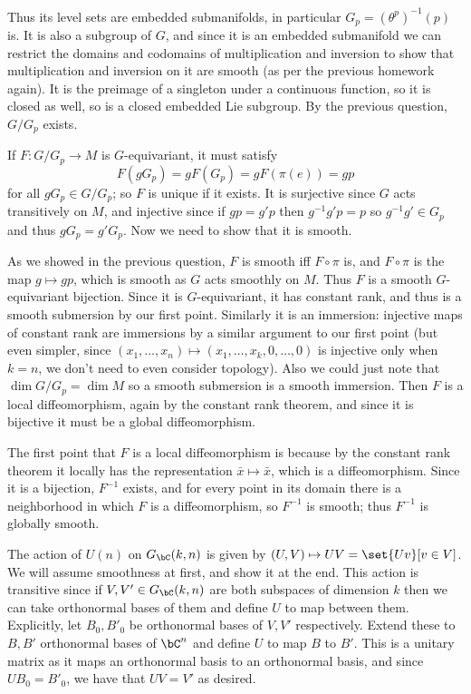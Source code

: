     Thus its level sets are embedded submanifolds, in particular $G_p=(\theta^p)^{-1}(p)$ is.
    It is also a subgroup of $G$, and since it is an embedded submanifold we can restrict the domains and codomains of multiplication and inversion to show that multiplication
    and inversion on it are smooth (as per the previous homework again).
    It is the preimage of a singleton under a continuous function, so it is closed as well, so is a closed embedded Lie subgroup.
    By the previous question, $G/G_p$ exists.

    \item If $F\colon G/G_p\to M$ is $G$-equivariant, it must satisfy
    $$ F(gG_p) = gF(G_p) = gF(\pi(e)) = gp $$
    for all $gG_p\in G/G_p$; so $F$ is unique if it exists.
    It is surjective since $G$ acts transitively on $M$, and injective since if $gp=g'p$ then $g^{-1}g'p=p$ so $g^{-1}g'\in G_p$ and thus $gG_p=g'G_p$.
    Now we need to show that it is smooth.

    As we showed in the previous question, $F$ is smooth iff $F\circ\pi$ is, and $F\circ\pi$ is the map $g\mapsto gp$, which is smooth as $G$ acts smoothly on $M$.
    Thus $F$ is a smooth $G$-equivariant bijection.
    Since it is $G$-equivariant, it has constant rank, and thus is a smooth submersion by our first point.
    Similarly it is an immersion: injective maps of constant rank are immersions by a similar argument to our first point (but even simpler, since $(x_1,\dots,x_n)\mapsto(x_1,\dots,x_k,0,\dots,0)$
    is injective only when $k=n$, we don't need to even consider topology).
    Also we could just note that $\dim G/G_p=\dim M$ so a smooth submersion is a smooth immersion.
    Then $F$ is a local diffeomorphism, again by the constant rank theorem, and since it is bijective it must be a global diffeomorphism.

    The first point that $F$ is a local diffeomorphism is because by the constant rank theorem it locally has the representation $\bar x\mapsto\bar x$, which is a diffeomorphism.
    Since it is a bijection, $F^{-1}$ exists, and for every point in its domain there is a neighborhood in which $F$ is a diffeomorphism, so $F^{-1}$ is smooth; thus $F^{-1}$
    is globally smooth.

    \item The action of $U(n)$ on $G_\bC(k,n)$ is given by $(U,V)\mapsto UV=\set{Uv}[v\in V]$.
    We will assume smoothness at first, and show it at the end.
    This action is transitive since if $V,V'\in G_\bC(k,n)$ are both subspaces of dimension $k$ then we can take orthonormal bases of them and define $U$ to map between them.
    Explicitly, let $B_0,B'_0$ be orthonormal bases of $V,V'$ respectively.
    Extend these to $B,B'$ orthonormal bases of $\bC^n$ and define $U$ to map $B$ to $B'$.
    This is a unitary matrix as it maps an orthonormal basis to an orthonormal basis, and since $UB_0=B'_0$, we have that $UV=V'$ as desired.

